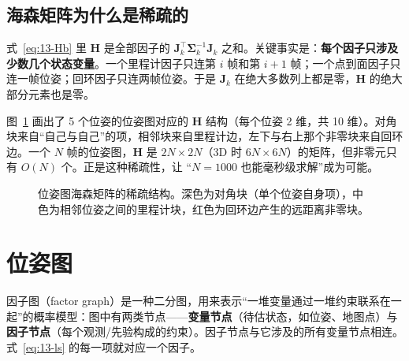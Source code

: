 \subsection{海森矩阵为什么是稀疏的}

式~\eqref{eq:13-Hb} 里 $\bm{H}$ 是全部因子的 ${\bm{J}_k^{\top}\bm{\Sigma}_k^{-1}\bm{J}_k}$ 之和。关键事实是：\textbf{每个因子只涉及少数几个状态变量}。一个里程计因子只连第 $i$ 帧和第 $i+1$ 帧；一个点到面因子只连一帧位姿；回环因子只连两帧位姿。于是 $\bm{J}_k$ 在绝大多数列上都是零，$\bm{H}$ 的绝大部分元素也是零。

图~\ref{fig:13-sparse} 画出了 5 个位姿的位姿图对应的 $\bm{H}$ 结构（每个位姿 2 维，共 10 维）。对角块来自``自己与自己''的项，相邻块来自里程计边，左下与右上那个非零块来自回环边。一个 $N$ 帧的位姿图，$\bm{H}$ 是 $2N\times2N$（3D 时 $6N\times6N$）的矩阵，但非零元只有 $O(N)$ 个。正是这种稀疏性，让 ``$N=1000$ 也能毫秒级求解''成为可能。

\begin{figure}[htbp]
  \centering
  \caption{位姿图海森矩阵的稀疏结构。深色为对角块（单个位姿自身项），中色为相邻位姿之间的里程计块，红色为回环边产生的远距离非零块。}\label{fig:13-sparse}
\end{figure}

\section{位姿图}\label{sec:13-posegraph}

\begin{definition}[因子图]
因子图（factor graph）是一种二分图，用来表示``一堆变量通过一堆约束联系在一起''的概率模型：图中有两类节点——\textbf{变量节点}（待估状态，如位姿、地图点）与\textbf{因子节点}（每个观测/先验构成的约束）。因子节点与它涉及的所有变量节点相连。式~\eqref{eq:13-ls} 的每一项就对应一个因子。
\end{definition}


